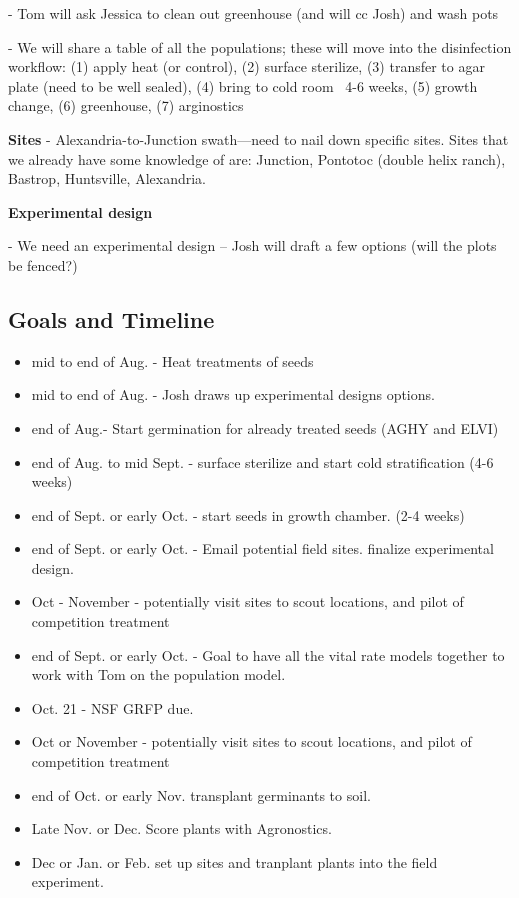 \documentclass{article}
\begin{document}
\begin{itemize}
{-   Tom will ask Jessica to clean out greenhouse (and will cc Josh) and wash pots

-   We will share a table of all the populations; these will move into the disinfection workflow: (1) apply heat (or control), (2) surface sterilize, (3) transfer to agar plate (need to be well sealed), (4) bring to cold room ~4-6 weeks, (5) growth change, (6) greenhouse, (7) arginostics

\textbf{Sites}
-   Alexandria-to-Junction swath—need to nail down specific sites. Sites that we already have some knowledge of are: Junction, Pontotoc (double helix ranch), Bastrop, Huntsville, Alexandria.

\textbf{Experimental design}

-   We need an experimental design – Josh will draft a few options (will the plots be fenced?)}

\end{itemize}


\subsection*{Goals and Timeline}
\begin{itemize}

\item{mid to end of Aug. - Heat treatments of seeds}
\item{mid to end of Aug. - Josh draws up experimental designs options.} 
\item{end of Aug.- Start germination for already treated seeds (AGHY and ELVI)}
\item{end of Aug. to mid Sept. - surface sterilize and start cold stratification (4-6 weeks)}
\item{end of Sept. or early Oct. - start seeds in growth chamber. (2-4 weeks)}
\item{end of Sept. or early Oct. - Email potential field sites. finalize experimental design.}
\item{Oct - November - potentially visit sites to scout locations, and pilot of competition treatment}
\item{end of Sept. or early Oct. - Goal to have all the vital rate models together to work with Tom on the population model.}
\item{Oct. 21 - NSF GRFP due.}
\item{Oct or November - potentially visit sites to scout locations, and pilot of competition treatment}

\item{end of Oct. or early Nov. transplant germinants to soil.}
\item{Late Nov. or Dec. Score plants with Agronostics.}
\item{Dec or Jan. or Feb. set up sites and tranplant plants into the field experiment.}
\end{itemize}
 
\end{document}
